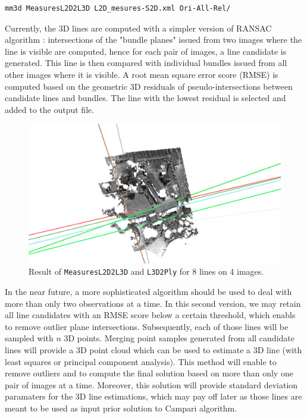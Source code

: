 \begin{verbatim}
mm3d MeasuresL2D2L3D L2D_mesures-S2D.xml Ori-All-Rel/
\end{verbatim}
\vspace{0.3cm}

\noindent Currently, the 3D lines are computed with a simpler version of RANSAC algorithm : intersections of the "bundle planes" issued from two images where the line is visible are computed, hence for each pair of images, a line candidate is generated. This line is then compared with individual bundles issued from all other images where it is visible. A root mean square error score (RMSE) is computed based on the geometric 3D residuals of pseudo-intersections between candidate lines and bundles. The line with the lowest residual is selected and added to the output file.  \newline

\begin{figure}[!h]
	\begin{center}
		\includegraphics[width=140mm]{FIGS/Cuxa/linesWithMeshlab.png}
	\end{center}
	\caption{Result of \texttt{MeasuresL2D2L3D} and \texttt{L3D2Ply} for 8 lines on 4 images. }
\end{figure}


\noindent In the near future, a more sophisticated algorithm should be used to deal with more than only two observations at a time. In this second version, we may retain all line candidates with an RMSE score below a certain threshold, which enabls to remove outlier plane intersections. Subsequently, each of those lines will be sampled with $n$ 3D points. Merging point samples generated from all candidate lines will provide a 3D point cloud which can be used to estimate a 3D line (with least squares or principal component analysis). This method will enable to remove outliers and to compute the final solution based on more than only one pair of images at a time. Moreover, this solution will provide standard deviation paramaters for the 3D line estimations, which may pay off later as those lines are meant to be used as input prior solution to Campari algorithm.  \newline 

